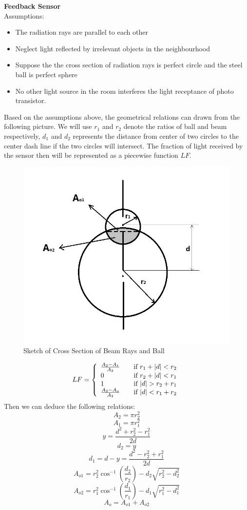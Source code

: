 \documentclass[letterpaper]{article}
\begin{document}
\textbf{\large{Feedback Sensor}}\\
Assumptions:
\begin{itemize}
	\item The radiation rays are parallel to each other
	\item Neglect light reflected by irrelevant objects in the neighbourhood
	\item Suppose the the cross section of radiation rays is perfect circle and the steel ball is perfect sphere
	\item No other light source in the room interferes the light receptance of photo transistor.
\end{itemize}
Based on the assumptions above, the geometrical relations can drawn from the following picture. We will use $r_1$ and $r_2$ denote the ratios of ball and beam respectively, $d_1$ and $d_2$ represents the distance from center of two circles to the center dash line if the two circles will intersect. The fraction of light received by the sensor then will be represented as a piecewise function $LF$.
\begin{figure}[H]
\centering
\includegraphics[scale=0.5]{beam.jpeg}
\caption{Sketch of Cross Section of Beam Rays and Ball}
\end{figure} 
\[
   LF = \left\{
  \begin{array}{l l}
    \frac{A_{2} - A_{1}}{A_{2}} & \quad \text{if } r_{1} + |d| < r_{2} \\
    0 & \quad \text{if } r_{2} + |d| < r_{1} \\
    1 & \quad \text{if } |d| > r_{2} + r_{1} \\
    \frac{A_{2} - A_{o}}{A_{2}} & \quad \text{if } |d| < r_{1} + r_{2} \\
  \end{array} \right.
\]
Then we can deduce the following relations:
$$ A_{2} = \pi r_{2}^2$$
$$A_{1} = \pi r_{1}^2 $$ 
$$ y = \frac{d^2+r_{2}^2-r_{1}^2}{2d}$$
$$ d_{2}=y$$
$$ d_{1}=d-y=\frac{d^2-r_{2}^2+r_{1}^2}{2d} $$
$$ A_{o1} = r_{2}^2 \cos^{-1} (\frac{d_{2}}{r_{2}})-d_{2} \sqrt{r_{2}^2-d_{2}^2}$$ 
$$ A_{o2} = r_{1}^2 \cos^{-1} (\frac{d_{1}}{r_{1}})-d_{1} \sqrt{r_{1}^2-d_{1}^2}$$
$$ A_{o} = A_{o1} + A_{o2} $$
\end{document}
